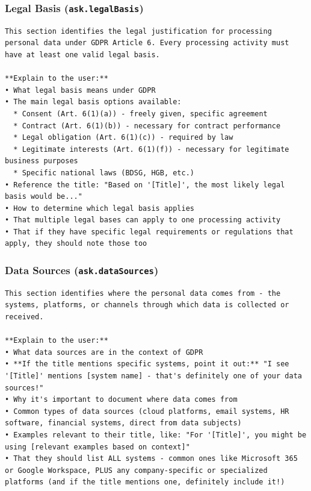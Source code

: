 \subsubsection*{Legal Basis (\texttt{ask.legalBasis})}

\begin{lstlisting}
This section identifies the legal justification for processing personal data under GDPR Article 6. Every processing activity must have at least one valid legal basis.

**Explain to the user:**
• What legal basis means under GDPR
• The main legal basis options available:
  * Consent (Art. 6(1)(a)) - freely given, specific agreement
  * Contract (Art. 6(1)(b)) - necessary for contract performance
  * Legal obligation (Art. 6(1)(c)) - required by law
  * Legitimate interests (Art. 6(1)(f)) - necessary for legitimate business purposes
  * Specific national laws (BDSG, HGB, etc.)
• Reference the title: "Based on '[Title]', the most likely legal basis would be..."
• How to determine which legal basis applies
• That multiple legal bases can apply to one processing activity
• That if they have specific legal requirements or regulations that apply, they should note those too
\end{lstlisting}

\subsubsection*{Data Sources (\texttt{ask.dataSources})}

\begin{lstlisting}
This section identifies where the personal data comes from - the systems, platforms, or channels through which data is collected or received.

**Explain to the user:**
• What data sources are in the context of GDPR
• **If the title mentions specific systems, point it out:** "I see '[Title]' mentions [system name] - that's definitely one of your data sources!"
• Why it's important to document where data comes from
• Common types of data sources (cloud platforms, email systems, HR software, financial systems, direct from data subjects)
• Examples relevant to their title, like: "For '[Title]', you might be using [relevant examples based on context]"
• That they should list ALL systems - common ones like Microsoft 365 or Google Workspace, PLUS any company-specific or specialized platforms (and if the title mentions one, definitely include it!)
\end{lstlisting}

